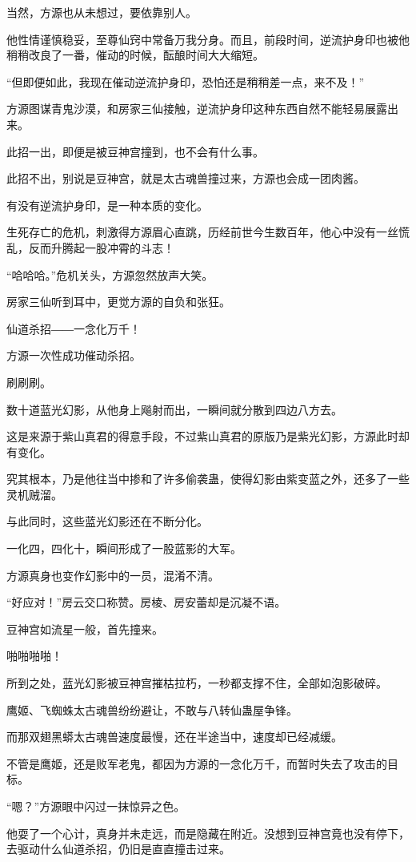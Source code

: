 \begin{this_body}
当然，方源也从未想过，要依靠别人。

他性情谨慎稳妥，至尊仙窍中常备万我分身。而且，前段时间，逆流护身印也被他稍稍改良了一番，催动的时候，酝酿时间大大缩短。

“但即便如此，我现在催动逆流护身印，恐怕还是稍稍差一点，来不及！”

方源图谋青鬼沙漠，和房家三仙接触，逆流护身印这种东西自然不能轻易展露出来。

此招一出，即便是被豆神宫撞到，也不会有什么事。

此招不出，别说是豆神宫，就是太古魂兽撞过来，方源也会成一团肉酱。

有没有逆流护身印，是一种本质的变化。

生死存亡的危机，刺激得方源眉心直跳，历经前世今生数百年，他心中没有一丝慌乱，反而升腾起一股冲霄的斗志！

“哈哈哈。”危机关头，方源忽然放声大笑。

房家三仙听到耳中，更觉方源的自负和张狂。

仙道杀招――一念化万千！

方源一次性成功催动杀招。

刷刷刷。

数十道蓝光幻影，从他身上飚射而出，一瞬间就分散到四边八方去。

这是来源于紫山真君的得意手段，不过紫山真君的原版乃是紫光幻影，方源此时却有变化。

究其根本，乃是他往当中掺和了许多偷袭蛊，使得幻影由紫变蓝之外，还多了一些灵机贼溜。

与此同时，这些蓝光幻影还在不断分化。

一化四，四化十，瞬间形成了一股蓝影的大军。

方源真身也变作幻影中的一员，混淆不清。

“好应对！”房云交口称赞。房棱、房安蕾却是沉凝不语。

豆神宫如流星一般，首先撞来。

啪啪啪啪！

所到之处，蓝光幻影被豆神宫摧枯拉朽，一秒都支撑不住，全部如泡影破碎。

鹰姬、飞蜘蛛太古魂兽纷纷避让，不敢与八转仙蛊屋争锋。

而那双翅黑蟒太古魂兽速度最慢，还在半途当中，速度却已经减缓。

不管是鹰姬，还是败军老鬼，都因为方源的一念化万千，而暂时失去了攻击的目标。

“嗯？”方源眼中闪过一抹惊异之色。

他耍了一个心计，真身并未走远，而是隐藏在附近。没想到豆神宫竟也没有停下，去驱动什么仙道杀招，仍旧是直直撞击过来。


\end{this_body}
